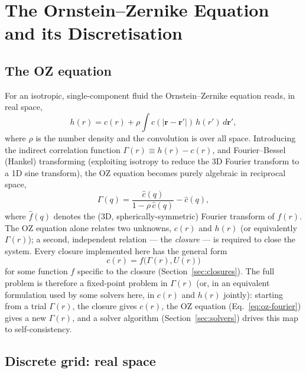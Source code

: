 \documentclass[11pt,a4paper]{article}
\begin{document}
\section{The Ornstein--Zernike Equation and its Discretisation}
\label{sec:theory}

\subsection{The OZ equation}

For an isotropic, single-component fluid the Ornstein--Zernike equation reads,
in real space,
\begin{equation}
  h(r) = c(r) + \rho \int c(|\mathbf{r}-\mathbf{r}'|)\, h(r')\, d\mathbf{r}',
\end{equation}
where $\rho$ is the number density and the convolution is over all space.
Introducing the indirect correlation function $\Gamma(r) \equiv h(r)-c(r)$, and
Fourier--Bessel (Hankel) transforming (exploiting isotropy to reduce the 3D
Fourier transform to a 1D sine transform), the OZ equation becomes purely
algebraic in reciprocal space,
\begin{equation}
  \hat\Gamma(q) = \frac{\hat c(q)}{1-\rho\,\hat c(q)} - \hat c(q),
  \label{eq:oz-fourier}
\end{equation}
where $\hat f(q)$ denotes the (3D, spherically-symmetric) Fourier transform of
$f(r)$. The OZ equation alone relates two unknowns, $c(r)$ and $h(r)$ (or
equivalently $\Gamma(r)$); a second, independent relation --- the
\emph{closure} --- is required to close the system. Every closure implemented
here has the general form
\begin{equation}
  c(r) = f\big(\Gamma(r), U(r)\big)
\end{equation}
for some function $f$ specific to the closure (Section~\ref{sec:closures}). The
full problem is therefore a fixed-point problem in $\Gamma(r)$ (or, in an
equivalent formulation used by some solvers here, in $c(r)$ and $h(r)$
jointly): starting from a trial $\Gamma(r)$, the closure gives $c(r)$, the OZ
equation (Eq.~\ref{eq:oz-fourier}) gives a new $\Gamma(r)$, and a solver
algorithm (Section~\ref{sec:solvers}) drives this map to self-consistency.

\subsection{Discrete grid: real space}
\end{document}
